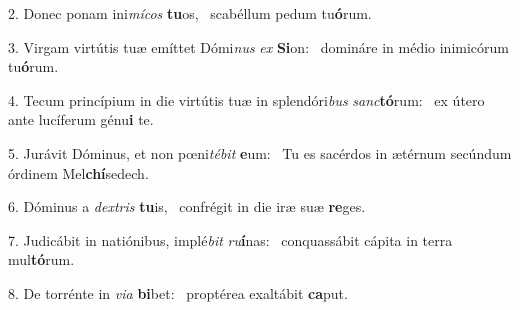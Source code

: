 2. Donec ponam ini\textit{mí}\textit{cos} \textbf{tu}os, \ast\  scabéllum pedum tu\textbf{ó}rum.\

3. Virgam virtútis tuæ emíttet Dómi\textit{nus} \textit{ex} \textbf{Si}on: \ast\  domináre in médio inimicórum tu\textbf{ó}rum.\

4. Tecum princípium in die virtútis tuæ in splendóri\textit{bus} \textit{sanc}\textbf{tó}rum: \ast\  ex útero ante lucíferum génu\textbf{i} te.\

5. Jurávit Dóminus, et non pœni\textit{té}\textit{bit} \textbf{e}um: \ast\  Tu es sacérdos in ætérnum secúndum órdinem Mel\textbf{chí}sedech.\

6. Dóminus a \textit{dex}\textit{tris} \textbf{tu}is, \ast\  confrégit in die iræ suæ \textbf{re}ges.\

7. Judicábit in natiónibus, implé\textit{bit} \textit{ru}\textbf{í}nas: \ast\  conquassábit cápita in terra mul\textbf{tó}rum.\

8. De torrénte in \textit{vi}\textit{a} \textbf{bi}bet: \ast\  proptérea exaltábit \textbf{ca}put.\

